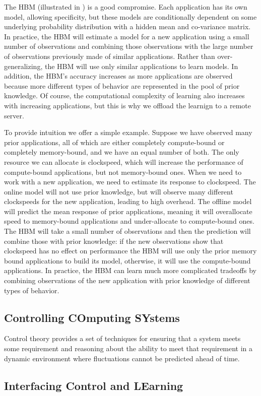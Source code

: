 The HBM (illustrated in ) is a good compromise.  Each
application has its own model, allowing specificity, but these models
are conditionally dependent on some underlying probability
distribution with a hidden mean and co-variance matrix.  In practice,
the HBM will estimate a model for a new application using a small
number of observations and combining those observations with the large
number of observations previously made of similar applications.
Rather than over-generalizing, the HBM will use only similar
applications to learn models.  In addition, the HBM's accuracy
increases as more applications are observed because more different
types of behavior are represented in the pool of prior knowledge.  Of
course, the computational complexity of learning also increases with
increasing applications, but this is why we offload the learnign to a
remote server.

To provide intuition we offer a simple example.  Suppose we have
observed many prior applications, all of which are either completely
compute-bound or completely memory-bound, and we have an equal number
of both.  The only resource we can allocate is clockspeed, which will
increase the performance of compute-bound applications, but not
memory-bound ones.  When we need to work with a new application, we
need to estimate its response to clockspeed.  The online model will
not use prior knowledge, but will observe many different clockspeeds
for the new application, leading to high overhead.  The offline model
will predict the mean response of prior applications, meaning it will
overallocate speed to memory-bound applications and under-allocate to
compute-bound ones.  The HBM will take a small number of observations
and then the prediction will combine those with prior knowledge: if
the new observations show that clockspeed has no effect on performance
the HBM will use only the prior memory bound applications to build its
model, otherwise, it will use the compute-bound applications.  In
practice, the HBM can learn much more complicated tradeoffs by
combining observations of the new application with prior knowledge of
different types of behavior.




\subsection{Controlling COmputing SYstems}
Control theory provides a set of techniques for ensuring that a system
meets some requirement and reasoning about the ability to meet that
requirement in a dynamic environment where fluctuations cannot be
predicted ahead of time.  



\subsection{Interfacing Control and LEarning}


